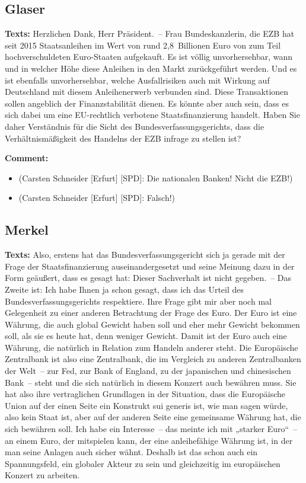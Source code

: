 \documentclass{article}
\begin{document}
\subsection{Glaser}
\noindent\textbf{Texts:} Herzlichen Dank, Herr Präsident. – Frau Bundeskanzlerin, die EZB hat seit 2015 Staatsanleihen im Wert von rund 2,8 Billionen Euro von zum Teil hochverschuldeten Euro-Staaten aufgekauft.  Es ist völlig unvorhersehbar, wann und in welcher Höhe diese Anleihen in den Markt zurückgeführt werden. Und es ist ebenfalls unvorhersehbar, welche Ausfallrisiken auch mit Wirkung auf Deutschland mit diesem Anleihenerwerb verbunden sind. Diese Transaktionen sollen angeblich der Finanzstabilität dienen. Es könnte aber auch sein, dass es sich dabei um eine EU-rechtlich verbotene Staatsfinanzierung handelt.  Haben Sie daher Verständnis für die Sicht des Bundesverfassungsgerichts, dass die Verhältnismäßigkeit des Handelns der EZB infrage zu stellen ist?

\noindent\textbf{Comment:}
\begin{itemize}
    \setlength\itemsep{-3pt}
    \item (Carsten Schneider [Erfurt] [SPD]: Die nationalen Banken! Nicht die EZB!)
    \setlength\itemsep{-3pt}
    \item (Carsten Schneider [Erfurt] [SPD]: Falsch!)
\end{itemize}
\subsection{Merkel}
\noindent\textbf{Texts:} Also, erstens hat das Bundesverfassungsgericht sich ja gerade mit der Frage der Staatsfinanzierung auseinandergesetzt und seine Meinung dazu in der Form geäußert, dass es gesagt hat: Dieser Sachverhalt ist nicht gegeben. – Das Zweite ist: Ich habe Ihnen ja schon gesagt, dass ich das Urteil des Bundesverfassungsgerichts respektiere. Ihre Frage gibt mir aber noch mal Gelegenheit zu einer anderen Betrachtung der Frage des Euro. Der Euro ist eine Währung, die auch global Gewicht haben soll und eher mehr Gewicht bekommen soll, als sie es heute hat, denn weniger Gewicht. Damit ist der Euro auch eine Währung, die natürlich in Relation zum Handeln anderer steht. Die Europäische Zentralbank ist also eine Zentralbank, die im Vergleich zu anderen Zentralbanken der Welt – zur Fed, zur Bank of England, zu der japanischen und chinesischen Bank – steht und die sich natürlich in diesem Konzert auch bewähren muss. Sie hat also ihre vertraglichen Grundlagen in der Situation, dass die Europäische Union auf der einen Seite ein Konstrukt sui generis ist, wie man sagen würde, also kein Staat ist, aber auf der anderen Seite eine gemeinsame Währung hat, die sich bewähren soll. Ich habe ein Interesse – das meinte ich mit „starker Euro“ – an einem Euro, der mitspielen kann, der eine anleihefähige Währung ist, in der man seine Anlagen auch sicher wähnt. Deshalb ist das schon auch ein Spannungsfeld, ein globaler Akteur zu sein und gleichzeitig im europäischen Konzert zu arbeiten.
\end{document}
